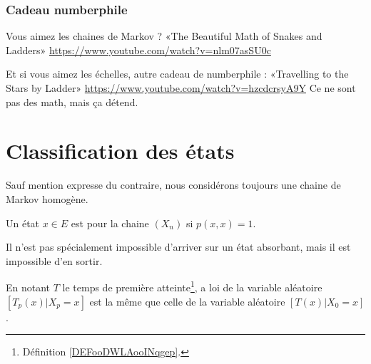 \subsubsection{Cadeau numberphile}

Vous aimez les chaines de Markov ? «The Beautiful Math of Snakes and Ladders» \url{https://www.youtube.com/watch?v=nlm07asSU0c}

Et si vous aimez les échelles, autre cadeau de numberphile : «Travelling to the Stars by Ladder»  \url{https://www.youtube.com/watch?v=hzcdcrsyA9Y} Ce ne sont pas des math, mais ça détend.


\section{Classification des états}

Sauf mention expresse du contraire, nous considérons toujours une chaine de Markov homogène.

\begin{definition}      \label{DEFooFIQUooScQDMI}
	Un état \( x\in E\) est  pour la chaine \( (X_n)\) si \( p(x,x)=1\).
\end{definition}
Il n'est pas spécialement impossible d'arriver sur un état absorbant, mais il est impossible d'en sortir.

\begin{proposition}
	En notant \( T\) le temps de première atteinte\footnote{Définition \ref{DEFooDWLAooINqgep}.}, a loi de la variable aléatoire \( [T_p(x)|X_p=x]\) est la même que celle de la variable aléatoire \( [T(x)|X_0=x]\).
\end{proposition}

